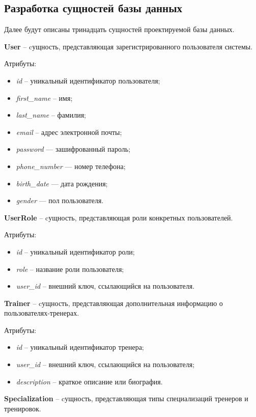 \subsection{Разработка сущностей базы данных}

Далее будут описаны тринадцать сущностей проектируемой базы данных.

\textbf{User} -- cущность, представляющая зарегистрированного пользователя системы.

Атрибуты: 
\begin{itemize} 
	\item \textit{id} -- уникальный идентификатор пользователя; 
	\item \textit{first\_name} -- имя;
	\item \textit{last\_name} -- фамилия; 
	\item \textit{email} -- адрес электронной почты;
	\item \textit{password} — зашифрованный пароль;
	\item \textit{phone\_number} — номер телефона;
	\item \textit{birth\_date} — дата рождения;
	\item \textit{gender} — пол пользователя. 
\end{itemize}

\textbf{UserRole} -- cущность, представляющая роли конкретных пользователей.

Атрибуты: 
\begin{itemize} 
	\item \textit{id} -- уникальный идентификатор роли;
	\item \textit{role} -- название роли пользователя;
	\item \textit{user\_id} -- внешний ключ, ссылающийся на пользователя.
\end{itemize}

\textbf{Trainer} -- cущность, представляющая дополнительная информацию о пользователях-тренерах.

Атрибуты: 
\begin{itemize} 
	\item \textit{id} -- уникальный идентификатор тренера;
	\item \textit{user\_id} -- внешний ключ, ссылающийся на пользователя;
	\item \textit{description} -- краткое описание или биография. 
\end{itemize}

\textbf{Specialization} -- cущность, представляющая типы специализаций тренеров и тренировок.

